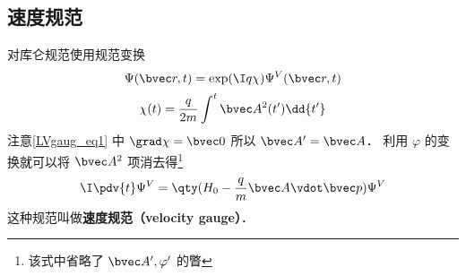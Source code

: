 \subsection{速度规范}
对库仑规范使用规范变换
\begin{equation}\label{LVgaug_eq3}
\Psi(\bvec r, t) = \exp(\I q\chi)\Psi^V(\bvec r, t)
\end{equation}
\begin{equation}\label{LVgaug_eq4}
\chi(t) = \frac{q}{2m} \int^t \bvec A^2(t') \dd{t'}
\end{equation}
注意\autoref{LVgaug_eq1} 中 $\grad \chi = \bvec 0$ 所以 $\bvec A' = \bvec A$． 利用 $\varphi$ 的变换就可以将 $\bvec A^2$ 项消去得\footnote{该式中省略了 $\bvec A', \varphi'$ 的瞥}
\begin{equation}
\I \pdv{t} \Psi^V = \qty(H_0 - \frac{q}{m} \bvec A \vdot \bvec p) \Psi^V
\end{equation}
这种规范叫做\textbf{速度规范（velocity gauge）}．


